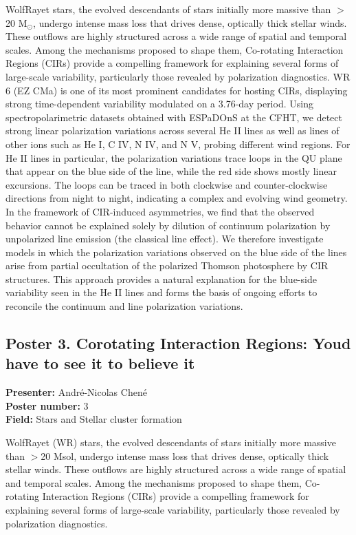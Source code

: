 WolfRayet stars, the evolved descendants of stars initially more massive than $>$20 M$_\odot$, undergo intense mass loss that drives dense, optically thick stellar winds. These outflows are highly structured across a wide range of spatial and temporal scales. Among the mechanisms proposed to shape them, Co-rotating Interaction Regions (CIRs) provide a compelling framework for explaining several forms of large-scale variability, particularly those revealed by polarization diagnostics. WR 6 (EZ CMa) is one of its most prominent candidates for hosting CIRs, displaying strong time-dependent variability modulated on a 3.76-day period. Using spectropolarimetric datasets obtained with ESPaDOnS at the CFHT, we detect strong linear polarization variations across several He II lines as well as lines of other ions such as He I, C IV, N IV, and N V, probing different wind regions. For He II lines in particular, the polarization variations trace loops in the QU plane that appear on the blue side of the line, while the red side shows mostly linear excursions. The loops can be traced in both clockwise and counter-clockwise directions from night to night, indicating a complex and evolving wind geometry. In the framework of CIR-induced asymmetries, we find that the observed behavior cannot be explained solely by dilution of continuum polarization by unpolarized line emission (the classical line effect). We therefore investigate models in which the polarization variations observed on the blue side of the lines arise from partial occultation of the polarized Thomson photosphere by CIR structures. This approach provides a natural explanation for the blue-side variability seen in the He II lines and forms the basis of ongoing efforts to reconcile the continuum and line polarization variations.

\hypertarget{poster-abstract-talk-286}{}\label{poster-abstract-page-talk-286}
\subsection*{Poster 3. Corotating Interaction Regions: Youd have to see it to believe it}
\textbf{Presenter:} André-Nicolas Chené\\
\textbf{Poster number:} 3\\
\textbf{Field:} Stars and Stellar cluster formation

WolfRayet (WR) stars, the evolved descendants of stars initially more massive than $>$20 Msol, undergo intense mass loss that drives dense, optically thick stellar winds. These outflows are highly structured across a wide range of spatial and temporal scales. Among the mechanisms proposed to shape them, Co-rotating Interaction Regions (CIRs) provide a compelling framework for explaining several forms of large-scale variability, particularly those revealed by polarization diagnostics.

